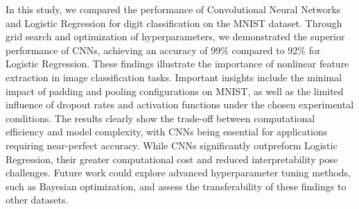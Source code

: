 In this study, we compared the performance of Convolutional Neural Networks and Logistic Regression for digit classification on the MNIST dataset. Through grid search and optimization of hyperparameters, we demonstrated the superior performance of CNNs, achieving an accuracy of 99\% compared to 92\% for Logistic Regression. These findings illustrate the importance of nonlinear feature extraction in image classification tasks. Important insights include the minimal impact of padding and pooling configurations on MNIST, as well as the limited influence of dropout rates and activation functions under the chosen experimental conditions. The results clearly show the trade-off between computational efficiency and model complexity, with CNNs being essential for applications requiring near-perfect accuracy. While CNNs significantly outpreform Logistic Regression, their greater computational cost and reduced interpretability pose challenges. Future work could explore advanced hyperparameter tuning methods, such as Bayesian optimization, and assess the transferability of these findings to other datasets. 